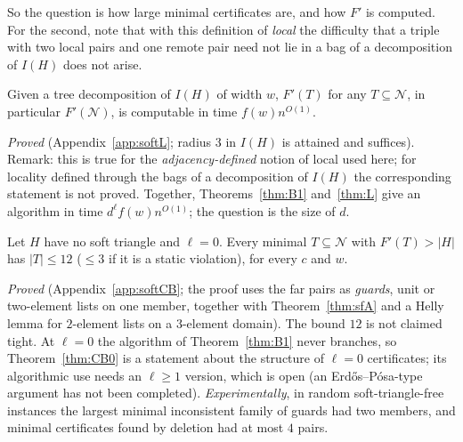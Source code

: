 So the question is how large minimal certificates are, and how $F'$ is computed. For the second, note that with this definition of \emph{local} the difficulty that a triple with two local pairs and one remote pair need not lie in a bag of a decomposition of $I(H)$ does not arise.
\begin{theorem}\label{thm:L}
Given a tree decomposition of $I(H)$ of width $w$, $F'(T)$ for any $T\subseteq\mathcal N$, in particular $F'(\mathcal N)$, is computable in time $f(w)n^{O(1)}$.
\end{theorem}
\emph{Proved} (Appendix~\ref{app:softL}; radius $3$ in $I(H)$ is attained and suffices). Remark: this is true for the \emph{adjacency-defined} notion of local used here; for locality defined through the bags of a decomposition of $I(H)$ the corresponding statement is not proved. Together, Theorems~\ref{thm:B1} and~\ref{thm:L} give an algorithm in time $d^{\ell}f(w)n^{O(1)}$; the question is the size of $d$.

\begin{theorem}[Core bound at $\ell=0$ without soft triangles]\label{thm:CB0}
Let $H$ have no soft triangle and $\ell=0$. Every minimal $T\subseteq\mathcal N$ with $F'(T)>|H|$ has $|T|\le12$ ($\le3$ if it is a static violation), for every $c$ and $w$.
\end{theorem}
\emph{Proved} (Appendix~\ref{app:softCB}; the proof uses the far pairs as \emph{guards}, unit or two-element lists on one member, together with Theorem~\ref{thm:sfA} and a Helly lemma for $2$-element lists on a $3$-element domain). The bound $12$ is not claimed tight. At $\ell=0$ the algorithm of Theorem~\ref{thm:B1} never branches, so Theorem~\ref{thm:CB0} is a statement about the structure of $\ell=0$ certificates; its algorithmic use needs an $\ell\ge1$ version, which is open (an Erd\H{o}s--P\'osa-type argument has not been completed). \emph{Experimentally}, in random soft-triangle-free instances the largest minimal inconsistent family of guards had two members, and minimal certificates found by deletion had at most $4$ pairs.

